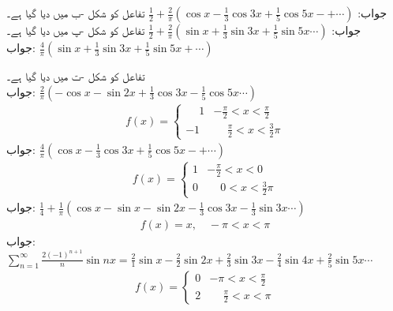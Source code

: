 جواب:\quad
$\tfrac{1}{2}+\tfrac{2}{\pi}(\cos x-\tfrac{1}{3}\cos 3x+\tfrac{1}{5}\cos 5x-+\cdots)$
\quad تفاعل کو شکل -ب میں دیا گیا ہے۔\\
جواب:\quad
$\tfrac{1}{2}+\tfrac{2}{\pi}(\sin x+\tfrac{1}{3}\sin 3x+\tfrac{1}{5}\sin 5x\cdots)$
\quad تفاعل کو شکل -پ میں دیا گیا ہے۔\\
جواب:\quad
$\tfrac{4}{\pi}(\sin x+\tfrac{1}{3}\sin 3x+\tfrac{1}{5}\sin 5x+\cdots)$

\quad تفاعل کو شکل -ت میں دیا گیا ہے۔\\
جواب:\quad
$\tfrac{2}{\pi}(-\cos x-\sin 2x+\tfrac{1}{3}\cos 3x-\tfrac{1}{5}\cos 5x\cdots)$
\begin{align*}
f(x)=
\begin{cases}
\phantom{-}1& -\frac{\pi}{2}<x<\frac{\pi}{2}\\
-1&\phantom{-}\frac{\pi}{2}<x<\frac{3}{2}\pi
\end{cases}
\end{align*}
جواب:\quad
$\tfrac{4}{\pi}(\cos x-\tfrac{1}{3}\cos 3x+\tfrac{1}{5}\cos 5x-+\cdots)$
\begin{align*}
f(x)=
\begin{cases}
1& -\frac{\pi}{2}<x<0\\
0&\phantom{-}0<x<\frac{3}{2}\pi
\end{cases}
\end{align*}
جواب:\quad
$\tfrac{1}{4}+\tfrac{1}{\pi}(\cos x-\sin x-\sin 2x-\tfrac{1}{3}\cos 3x-\tfrac{1}{3}\sin 3x\cdots)$
\begin{align*}
f(x)=x,\quad -\pi<x<\pi
\end{align*}
جواب:\quad
$\sum\limits_{n=1}^{\infty}\tfrac{2(-1)^{n+1}}{n}\sin nx=\tfrac{2}{1}\sin x-\tfrac{2}{2}\sin 2x+\tfrac{2}{3}\sin 3x-\tfrac{2}{4}\sin 4x+\tfrac{2}{5}\sin 5x\cdots$
\begin{align*}
f(x)=
\begin{cases}
0& -\pi<x<\tfrac{\pi}{2}\\
2 & \phantom{-}\tfrac{\pi}{2}<x<\pi
\end{cases}
\end{align*}
